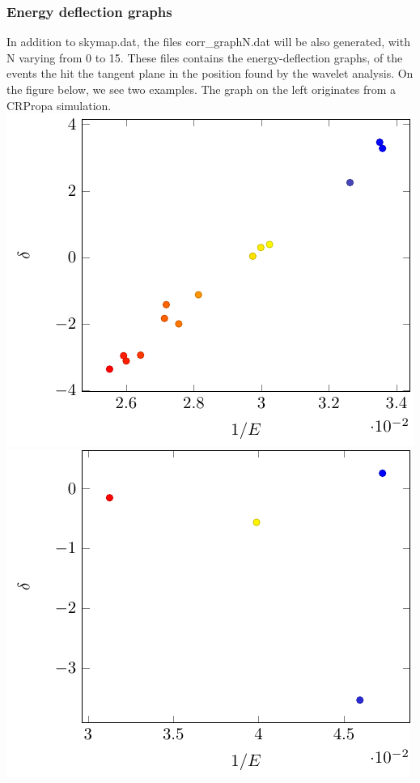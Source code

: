 \documentclass[12pt]{article}
\begin{document}
\subsubsection{Energy deflection graphs}
In addition to skymap.dat, the files {\color{brown}corr\_graphN.dat} will be also generated, 
with N varying from 0 to 15. These files contains the energy-deflection graphs,
of the events the hit the tangent plane in the position found by the wavelet
analysis. On the figure below, we see two examples. The graph on the left
originates from a CRPropa simulation. \\
\includegraphics[scale=0.8]{corr_graph.pdf} 
\includegraphics[scale=0.8]{corr_graph-sim.pdf} \hfill
\end{document}
